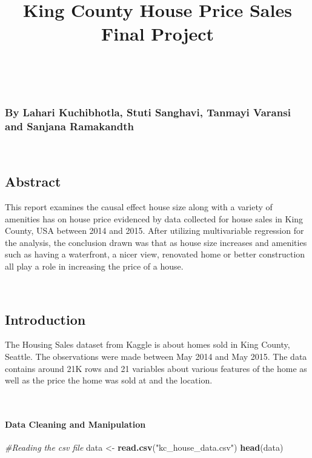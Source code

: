 \documentclass[
]{article}
\title{King County House Price Sales Final Project}
\author{}
\date{\vspace{-2.5em}}
\newenvironment{Shaded}{\begin{snugshade}}{\end{snugshade}}
\newcommand{\CommentTok}[1]{\textcolor[rgb]{0.56,0.35,0.01}{\textit{#1}}}
\newcommand{\KeywordTok}[1]{\textcolor[rgb]{0.13,0.29,0.53}{\textbf{#1}}}
\newcommand{\NormalTok}[1]{#1}
\newcommand{\StringTok}[1]{\textcolor[rgb]{0.31,0.60,0.02}{#1}}
\begin{document}
\maketitle

~

\hypertarget{by-lahari-kuchibhotla-stuti-sanghavi-tanmayi-varansi-and-sanjana-ramakandth}{%
\subsubsection{By Lahari Kuchibhotla, Stuti Sanghavi, Tanmayi Varansi
and Sanjana
Ramakandth}\label{by-lahari-kuchibhotla-stuti-sanghavi-tanmayi-varansi-and-sanjana-ramakandth}}

~

\hypertarget{abstract}{%
\subsection{Abstract}\label{abstract}}

This report examines the causal effect house size along with a variety
of amenities has on house price evidenced by data collected for house
sales in King County, USA between 2014 and 2015. After utilizing
multivariable regression for the analysis, the conclusion drawn was that
as house size increases and amenities such as having a waterfront, a
nicer view, renovated home or better construction all play a role in
increasing the price of a house.

~

\hypertarget{introduction}{%
\subsection{Introduction}\label{introduction}}

The Housing Sales dataset from Kaggle is about homes sold in King
County, Seattle. The observations were made between May 2014 and May
2015. The data contains around 21K rows and 21 variables about various
features of the home as well as the price the home was sold at and the
location.

~

\hypertarget{data-cleaning-and-manipulation}{%
\paragraph{Data Cleaning and
Manipulation}\label{data-cleaning-and-manipulation}}

\begin{Shaded}
\begin{Highlighting}[]
\CommentTok{#Reading the csv file}
\NormalTok{data <-}\StringTok{ }\KeywordTok{read.csv}\NormalTok{(}\StringTok{"kc_house_data.csv"}\NormalTok{)}
\KeywordTok{head}\NormalTok{(data)}
\end{Highlighting}
\end{Shaded}
\end{document}
